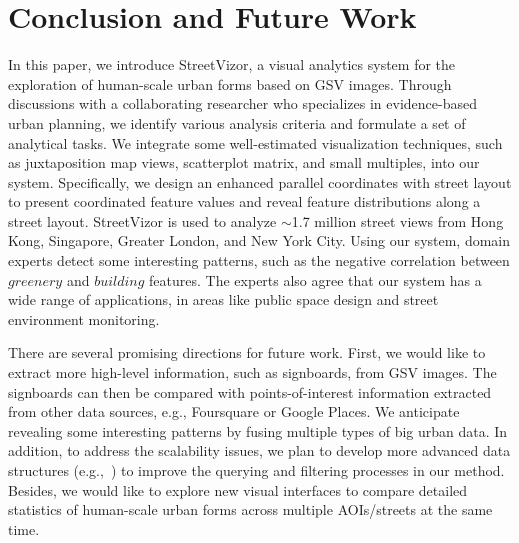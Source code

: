\section{Conclusion and Future Work}

In this paper, we introduce StreetVizor, a visual analytics system for the exploration of human-scale urban forms based on GSV images.
Through discussions with a collaborating researcher who specializes in evidence-based urban planning, we identify various analysis criteria and formulate a set of analytical tasks.
We integrate some well-estimated visualization techniques, such as juxtaposition map views, scatterplot matrix, and small multiples, into our system.
Specifically, we design an enhanced parallel coordinates with street layout to present coordinated feature values and reveal feature distributions along a street layout.
StreetVizor is used to analyze $\sim$1.7 million street views from Hong Kong, Singapore, Greater London, and New York City.
Using our system, domain experts detect some interesting patterns, such as the negative correlation between $greenery$ and $building$ features.
The experts also agree that our system has a wide range of applications, in areas like public space design and  street environment monitoring.

There are several promising directions for future work.
First, we would like to extract more high-level information, such as signboards, from GSV images.
The signboards can then be compared with points-of-interest information extracted from other data sources, e.g., Foursquare or Google Places.
We anticipate revealing some interesting patterns by fusing multiple types of big urban data.
In addition, to address the scalability issues, we plan to develop more advanced data structures (e.g.,~\cite{lins_2013_nanocubes, wang_2017_gaussian}) to improve the querying and filtering processes in our method.
Besides, we would like to explore new visual interfaces to compare detailed statistics of human-scale urban forms across multiple AOIs/streets at the same time.
